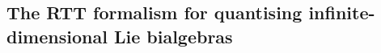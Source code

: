     \subsection{The RTT formalism for quantising infinite-dimensional Lie bialgebras}
        \begin{example}
            
        \end{example}

        \begin{example} \label{example: affine_QUEs}

        \end{example}

        \begin{example} \label{example: toroidal_QUEs}

        \end{example}